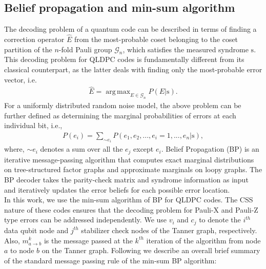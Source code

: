 \documentclass[%
 reprint,
 amsmath,amssymb,
 aps,
pra,
showkeys,
]{revtex4-2}
\DeclareMathOperator*{\argmax}{arg\,max}
\begin{document}
\subsection{Belief propagation and min-sum algorithm}
The decoding problem of a quantum code can be described in terms of finding a correction operator $\hat{E}$ from the most-probable coset belonging to the coset partition of the $n$-fold Pauli group $\mathcal{G}_n$, which satisfies the measured syndrome $\mathrm{s}$.
This decoding problem for QLDPC codes is fundamentally different from its classical counterpart, as the latter deals with finding only the most-probable error vector, i.e. 
\begin{align}
    \hat{E} = \argmax_{E \in \mathcal{G}_n}P(E|\mathrm{s}).
\end{align}
For a uniformly distributed random noise model, the above problem can be further defined as determining the marginal probabilities of errors at each individual bit, i.e.,
\begin{align}
    P(e_i) = \sum_{\sim e_i} P(e_1, e_2, ..., e_i = 1, ..., e_n | \mathrm{s}),
\end{align}
where, $\sim e_i$ denotes a sum over all the $e_j$ except $e_i$.
Belief Propagation (BP) is an iterative message-passing algorithm that computes exact marginal distributions on tree-structured factor graphs and approximate marginals on loopy graphs.
The BP decoder takes the parity-check matrix and syndrome information as input and iteratively updates the error beliefs for each possible error location.
\\
In this work, we use the min-sum algorithm of BP for QLDPC codes.
The CSS nature of these codes ensures that the decoding problem for Pauli-X and Pauli-Z type errors can be addressed independently.
We use $v_i$ and $c_j$ to denote the $i^{th}$ data qubit node and $j^{th}$ stabilizer check nodes of the Tanner graph, respectively.
Also, $m^{k}_{a \rightarrow b}$ is the message passed at the $k^{th}$ iteration of the algorithm from node $a$ to node $b$ on the Tanner graph.
Following we describe an overall brief summary of the standard message passing rule of the min-sum BP algorithm:
\end{document}
